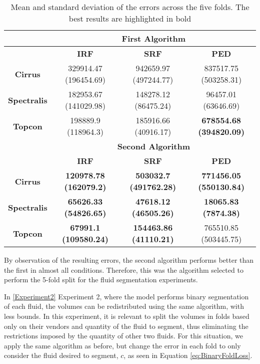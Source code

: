 \begin{table*}[!ht]
	\caption{Mean and standard deviation of the errors across the five folds. The best results are highlighted in bold}
	\centering
	\begin{tabular}{|c|c|c|c|}
		\hline
		& \multicolumn{3}{c|}{\textbf{First Algorithm}} \\
		\hline
		& \textbf{IRF} & \textbf{SRF} & \textbf{PED} \\
		\hline
		\textbf{Cirrus} & 329914.47 (196454.69) & 942659.97 (497244.77) & 837517.75 (503258.31) \\
		\textbf{Spectralis} & 182953.67 (141029.98) & 148278.12 (86475.24) & 96457.01 (63646.69) \\
		\textbf{Topcon} & 198889.9 (118964.3) & 185916.66 (40916.17) & \textbf{678554.68 (394820.09)} \\
		\hline
		& \multicolumn{3}{c|}{\textbf{Second Algorithm}} \\
		\hline
		& \textbf{IRF} & \textbf{SRF} & \textbf{PED} \\
		\hline
		\textbf{Cirrus} & \textbf{120978.78 (162079.2)} & \textbf{503032.7 (491762.28)} & \textbf{771456.05 (550130.84)} \\
		\textbf{Spectralis} & \textbf{65626.33 (54826.65)} & \textbf{47618.12 (46505.26)} & \textbf{18065.83 (7874.38)} \\
		\textbf{Topcon} & \textbf{67991.1 (109580.24)} & \textbf{154463.86 (41110.21)} & 765510.85 (503445.75) \\
		\hline
	\end{tabular}
	\label{tab:ErrorsInFirstAlgorithm}
\end{table*}

By observation of the resulting errors, the second algorithm performs better than the first in almost all conditions. Therefore, this was the algorithm selected to perform the 5-fold split for the fluid segmentation experiments.
\par
In \ref{Experiment2} Experiment 2, where the model performs binary segmentation of each fluid, the volumes can be redistributed using the same algorithm, with less bounds. In this experiment, it is relevant to split the volumes in folds based only on their vendors and quantity of the fluid to segment, thus eliminating the restrictions imposed by the quantity of other two fluids. For this situation, we apply the same algorithm as before, but change the error in each fold to only consider the fluid desired to segment, $c$, as seen in Equation \ref{eq:BinaryFoldLoss}.

